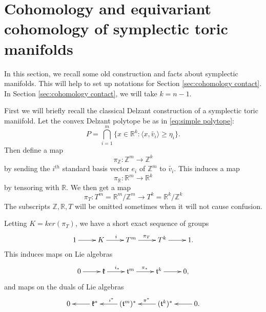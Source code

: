 \documentclass[12pt]{amsart}
\theoremstyle{definition}
\numberwithin{equation}{section}
\begin{document}
\section{\bf Cohomology and equivariant cohomology of symplectic toric
manifolds}\label{sec:symplectic orbifold} In this section, we recall
some old construction and facts about symplectic manifolds. This
will help to set up notations for Section \ref{sec:cohomology
contact}. In Section \ref{sec:cohomology contact}, we will take
$k=n-1$.

 First we will briefly recall the classical Delzant construction of a symplectic toric
 maniifold.
Let the convex Delzant polytope be as in \eqref{eq:simple polytope}:
\begin{equation}
P= \bigcap_{i=1}^{m}\{x\in {{\mathbb{R}}}^k: \langle x, \tilde{v_{i}}\rangle
\geq \eta_{i}\}.\end{equation}
 Then define a map
\begin{equation}\label{eq:pi_Z}
\pi_{{\mathbb{Z}}}: {{\mathbb{Z}}}^m\rightarrow {{\mathbb{Z}}}^k
\end{equation}
by sending the $i^{th}$ standard basis vector $e_{i}$ of ${{\mathbb{Z}}}^m$ to
$\tilde{v_{i}}$. This induces a map
\begin{equation}
\pi_{{\mathbb{R}}}: {{\mathbb{R}}}^m\rightarrow {{\mathbb{R}}}^k
\end{equation}
by tensoring with ${{\mathbb{R}}}$. We then get a map
\begin{equation}\label{eq:pi_T}
\pi_{T}: T^m={{\mathbb{R}}}^m/{{\mathbb{Z}}}^m \rightarrow T^k={{\mathbb{R}}}^k/{{\mathbb{Z}}}^k
\end{equation}
The subscripts ${{\mathbb{Z}}},{{\mathbb{R}}},T$ will be omitted sometimes when it will not
cause confusion.

Letting $K=ker(\pi_{T})$, we have a short exact sequence of groups
\begin{equation}\label{eq:KT^mT^k}
\xymatrix{
  1 \ar[r]^{} & K \ar[r]^{i} & T^m \ar[r]^{\pi_{T}} & T^k \ar[r]^{} & 1.   }
\end{equation}
This induces maps on Lie algebras
\begin{equation}
\xymatrix{
  0 \ar[r]^{} & \mathfrak{k} \ar[r]^{i_{*}} & \mathfrak{t}^m \ar[r]^{\pi_{*}} & \mathfrak{t}^k \ar[r]^{} & 0 ,  }
\end{equation}
and maps on the duals of Lie algebras
\begin{equation}\xymatrix{0 & \mathfrak{k}^*\ar[l]^{} &
(\mathfrak{t}^m)^* \ar[l]_{i^*}& (\mathfrak{t}^k)^*\ar[l]_{\pi^*}&
0.\ar[l]}
\end{equation}
\end{document}
